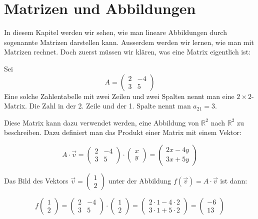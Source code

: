 \section{Matrizen und Abbildungen}
In diesem Kapitel werden wir sehen, wie man lineare Abbildungen durch sogenannte Matrizen darstellen kann. Ausserdem werden wir lernen, wie man mit Matrizen rechnet. Doch zuerst müssen wir klären, was eine Matrix eigentlich ist:
\begin{bsp}
{}{}
Sei 
\[
A = \begin{pmatrix} 2 & -4 \\ 3 & 5 \end{pmatrix}
\]
Eine solche Zahlentabelle mit zwei Zeilen und zwei Spalten nennt man eine \( 2 \times 2 \)-Matrix. Die Zahl in der 2. Zeile und der 1. Spalte nennt man \( a_{21} = 3 \).

Diese Matrix kann dazu verwendet werden, eine Abbildung von \( \mathbb{R}^2 \) nach \( \mathbb{R}^2 \) zu beschreiben. Dazu definiert man das Produkt einer Matrix mit einem Vektor:

\[
A \cdot \vec{v} =
\begin{pmatrix} 2 & -4 \\ 3 & 5 \end{pmatrix}
\cdot
\begin{pmatrix} x \\ y \end{pmatrix}
=
\begin{pmatrix} 2x - 4y \\ 3x + 5y \end{pmatrix}
\]

Das Bild des Vektors \( \vec{v} = \begin{pmatrix} 1 \\ 2 \end{pmatrix} \) unter der Abbildung \( f(\vec{v}) = A \cdot \vec{v} \) ist dann:

\[
f \begin{pmatrix} 1 \\ 2 \end{pmatrix} =
\begin{pmatrix} 2 & -4 \\ 3 & 5 \end{pmatrix}
\cdot
\begin{pmatrix} 1 \\ 2 \end{pmatrix}
=
\begin{pmatrix} 2 \cdot 1 - 4 \cdot 2 \\ 3 \cdot 1 + 5 \cdot 2 \end{pmatrix}
=
\begin{pmatrix} -6 \\ 13 \end{pmatrix}
\]
\end{bsp}
